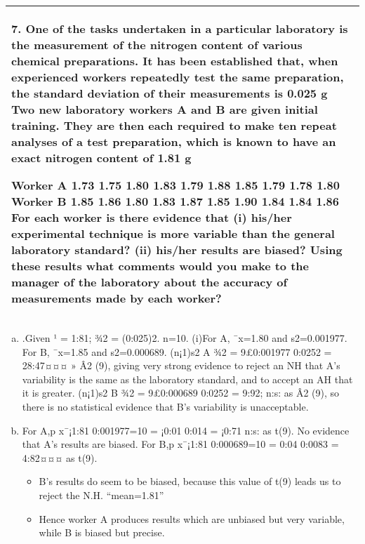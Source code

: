 \documentclass[a4paper,12pt]{article}
\begin{document}
\begin{table}[ht!]
 
\centering
 
\begin{tabular}{|p{15cm}|}
 
\hline  

7. One of the tasks undertaken in a particular laboratory is the measurement of the nitrogen content of various chemical preparations.  
It has been established that, when experienced workers repeatedly test the same preparation, the standard deviation of their measurements is 0.025 g%
Two new laboratory workers A and B are given initial training.  They are then each required to make ten repeat 
analyses of a test preparation, which is known to have an exact nitrogen content of 1.81 g%

Worker A 1.73 1.75 1.80 1.83 1.79 1.88 1.85 1.79 1.78 1.80
Worker B 1.85 1.86 1.80 1.83 1.87 1.85 1.90 1.84 1.84 1.86
For each worker is there evidence that
(i) his/her experimental technique is more variable than the general laboratory standard?
(ii) his/her results are biased?
Using these results what comments would you make to the manager of the laboratory about the accuracy of measurements made by each worker?
\\ \hline
  
\end{tabular}

\end{table}


\begin{enumerate}[(a)]
\item
.Given ¹ = 1:81; ¾2 = (0:025)2. n=10.
(i)For A, ¯x=1.80 and s2=0.001977.
For B, ¯x=1.85 and s2=0.000689.
(n¡1)s2
A
¾2 = 9£0:001977
0:0252 = 28:47¤¤¤ » Â2
(9), giving very strong evidence to reject an NH that A’s
variability is the same as the laboratory standard, and to accept an AH that it is greater.
(n¡1)s2
B
¾2 = 9£0:000689
0:0252 = 9:92; n:s: as Â2
(9), so there is no statistical evidence that B’s variability
is unacceptable.
\item For A,p x¯¡1:81
0:001977=10
= ¡0:01
0:014 = ¡0:71 n:s: as t(9).
No evidence that A’s results are biased.
For B,p x¯¡1:81
0:000689=10
= 0:04
0:0083 = 4:82¤¤¤ as t(9).
\begin{itemize}
    \item B’s results do seem to be biased, because this value of t(9) leads us to reject the N.H. “mean=1.81”
\item Hence worker A produces results which are unbiased but very variable, while B is biased but precise.
\end{itemize}

\end{enumerate}
\end{document}
